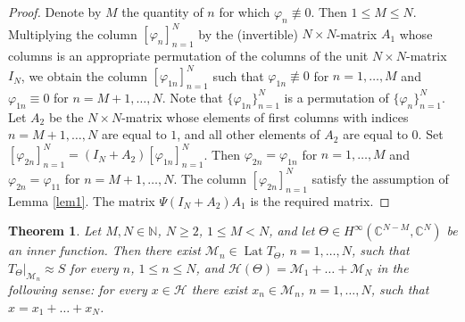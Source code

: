 \documentclass[a4paper,oneside,11pt]{amsart}
\numberwithin{equation}{section}
\theoremstyle{plain}
\newtheorem{theorem}{Theorem}[section]
\theoremstyle{definition}
\begin{document}
\begin{proof} Denote by $M$ the quantity of $n$ for which $\varphi_n\not\equiv 0$. Then $1\leq M\leq N$. Multiplying the column  
$[\varphi_n]_{n=1}^N$ by the (invertible) $N\times N$-matrix $A_1$ whose columns is an appropriate 
permutation of the columns of the unit $N\times N$-matrix $I_N$, we obtain the column  
$[\varphi_{1n}]_{n=1}^N$ such that  $\varphi_{1n}\not\equiv 0$ for $n=1,\ldots, M$ and  $\varphi_{1n}\equiv 0$ for $n=M+1,\ldots, N$. 
Note that $\{\varphi_{1n}\}_{n=1}^N$ is a permutation of  $\{\varphi_n\}_{n=1}^N$. 
Let $A_2$ be the $N\times N$-matrix  whose elements of first columns with indices  $n=M+1,\ldots, N$ are equal to $1$,
 and all other elements of $A_2$ are equal to $0$. Set $[\varphi_{2n}]_{n=1}^N=(I_N+A_2)[\varphi_{1n}]_{n=1}^N$. 
Then  $\varphi_{2n}=\varphi_{1n}$ for  $n=1,\ldots, M$ and  $\varphi_{2n}=\varphi_{11}$ for $n=M+1,\ldots, N$. 
The column $[\varphi_{2n}]_{n=1}^N$ satisfy the assumption of Lemma \ref{lem1}. The matrix $\Psi(I_N+A_2)A_1$ is the required matrix.
\end{proof}


\begin{theorem}\label{thm1} Let $M,N\in\mathbb N$, $N\geq 2$,  $1\leq M< N$, 
and let $\Theta\in H^\infty(\mathbb C^{N-M}, \mathbb C^N)$ be an inner function. 
Then there exist $\mathcal M_n\in\operatorname{Lat}T_\Theta$, $n=1,\ldots, N$, such that $T_\Theta|_{\mathcal M_n}\approx S$ for every $n$, $1\leq n\leq N$, and 
$\mathcal H(\Theta)=\mathcal M_1+\ldots+\mathcal M_N$  in the following sense: for every $x\in\mathcal H$ there exist 
  $x_n\in\mathcal M_n$, $n=1,\ldots, N$, such that $x=x_1+\ldots+x_N$.
\end{theorem}
\end{document}
